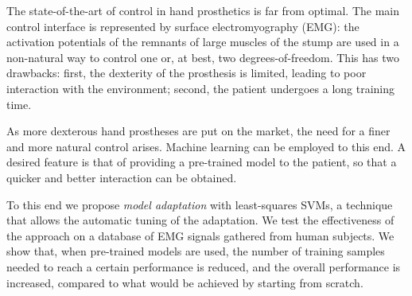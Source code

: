 The state-of-the-art of control in hand prosthetics is far from
optimal. The main control interface is represented by surface
electromyography (EMG): the activation potentials of the remnants of
large muscles of the stump are used in a non-natural way to control
one or, at best, two degrees-of-freedom. This has two drawbacks:
first, the dexterity of the prosthesis is limited, leading to poor
interaction with the environment; second, the patient undergoes a long
training time.

As more dexterous hand prostheses are put on the market, the need
for a finer and more natural control arises. Machine learning can be
employed to this end. A desired feature is that of providing a
pre-trained model to the patient, so that a quicker and better
interaction can be obtained.

To this end we propose \emph{model adaptation} with least-squares SVMs,
a technique that allows the automatic tuning of the adaptation. We test the
effectiveness of the approach on a database of EMG signals gathered from human
subjects.
We show that, when pre-trained models are used, the number of training samples
needed to reach a certain performance is reduced, and the overall performance is
increased, compared to what would be achieved by starting from scratch.
